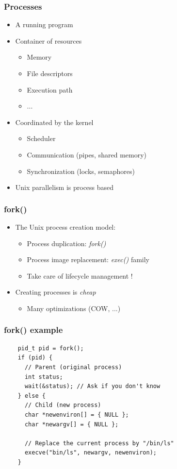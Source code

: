 \begin{frame}
  \frametitle{Processes}

  \begin{itemize}
  \item A running program
  \item Container of resources
    \begin{itemize}
    \item Memory
    \item File descriptors
    \item Execution path
    \item ...
    \end{itemize}
  \item Coordinated by the kernel
    \begin{itemize}
    \item Scheduler
    \item Communication (pipes, shared memory)
    \item Synchronization (locks, semaphores)
    \end{itemize}
  \item Unix parallelism is process based
  \end{itemize}
\end{frame}


\begin{frame}
  \frametitle{fork()}

  \begin{itemize}
  \item The Unix process creation model:
    \begin{itemize}
    \item Process duplication: \emph{fork()}
    \item Process image replacement: \emph{exec()} family
    \item Take care of lifecycle management !
    \end{itemize}
  \item Creating processes is \emph{cheap}
    \begin{itemize}
    \item Many optimizations (COW, ...)
    \end{itemize}
  \end{itemize}
\end{frame}


\begin{frame}[fragile]
  \frametitle{fork() example}

  \begin{verbatim}
    pid_t pid = fork();
    if (pid) {
      // Parent (original process)
      int status;
      wait(&status); // Ask if you don't know
    } else {
      // Child (new process)
      char *newenviron[] = { NULL };
      char *newargv[] = { NULL };

      // Replace the current process by "/bin/ls"
      execve("bin/ls", newargv, newenviron);
    }
  \end{verbatim}
\end{frame}



